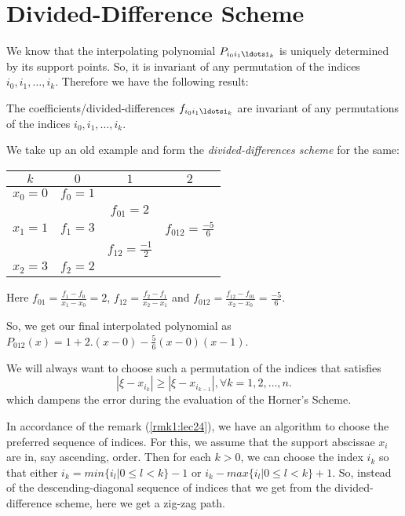 
\section{Divided-Difference Scheme}
We know that the interpolating polynomial $P_{i_0i_1\ldotsi_k}$ is uniquely determined by its support points. So, it is invariant of any permutation of the indices $ i_0,i_1,\ldots,i_k$. Therefore we have the following result:
\begin{thm}\label{thm1:lec24}
    The coefficients/divided-differences $f_{i_0i_1\ldotsi_k}$ are invariant of any permutations of the indices $ i_0,i_1,\ldots,i_k$.
\end{thm}

\begin{example}\label{ex1:lec24}

We take up an old example and form the \textit{divided-differences scheme} for the same:
    \begin{center}
    \begin{tabular}{c|ccc}
        $k$ &  $0$ &  $1$ &  $2$\\
        \hline
        $x_0=0$ & $f_0=1$ & \\
                & & $f_{01}=2$ & \\
        $ x_1=1$ & $ f_1=3$ & & $f_{012} = \frac{-5}{6}$\\
                 & &  $ f_{12}=\frac{-1}{2}$ &\\
        $ x_2=3$ & $ f_2=2$ & \\
    \end{tabular}
    \end{center}

Here $f_{01} = \frac{f_1-f_0}{x_1-x_0} = 2$, $f_{12} = \frac{f_2-f_1}{x_2-x_1}$ and $f_{012} = \frac{f_{12}-f_{01}}{x_2-x_0} = \frac{-5}{6}$.
 
So, we get our final interpolated polynomial as $P_{012}(x) = 1+2.(x-0)-\frac{5}{6}(x-0)(x-1)$.
\end{example}

\begin{rmk}\label{rmk1:lec24}
    We will always want to choose such a permutation of the indices that satisfies
    \[
        |\xi - x_{i_k}| \ge  |\xi - x_{i_{k-1}}|, \forall k=1,2,\ldots,n
    .\] 
which dampens the error during the evaluation of the Horner's Scheme.
\end{rmk}

In accordance of the remark (\ref{rmk1:lec24}), we have an algorithm to choose the preferred sequence of indices. For this, we assume that the support abscissae $x_i$ are in, say ascending, order. Then for each  $k>0$, we can choose the index  $i_k$ so that either  $i_k = min\{i_l|0\le l<k\}-1$ or $i_k - max\{i_l|0\le l<k\}+1$. So, instead of the descending-diagonal sequence of indices that we get from the divided-difference scheme, here we get a zig-zag path.

